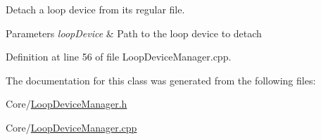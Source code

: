 Detach a loop device from its regular file. 


\begin{DoxyParams}{Parameters}
{\em loop\+Device} & Path to the loop device to detach \\
\hline
\end{DoxyParams}


Definition at line 56 of file Loop\+Device\+Manager.\+cpp.



The documentation for this class was generated from the following files\+:\begin{DoxyCompactItemize}
\item 
Core/\hyperlink{_loop_device_manager_8h}{Loop\+Device\+Manager.\+h}\item 
Core/\hyperlink{_loop_device_manager_8cpp}{Loop\+Device\+Manager.\+cpp}\end{DoxyCompactItemize}
